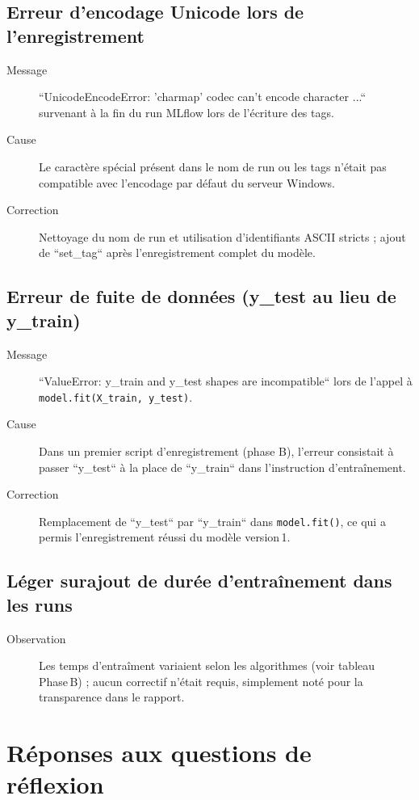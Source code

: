 \documentclass[12pt,a4paper]{report}
\begin{document}
\section{Erreur d'encodage Unicode lors de l'enregistrement}
\begin{description}
    \item[Message] ``UnicodeEncodeError: 'charmap' codec can't encode character ...`` survenant à la fin du run MLflow lors de l'écriture des tags.
    \item[Cause] Le caractère spécial présent dans le nom de run ou les tags n'était pas compatible avec l'encodage par défaut du serveur Windows.
    \item[Correction] Nettoyage du nom de run et utilisation d'identifiants ASCII stricts ; ajout de ``set\_tag`` après l'enregistrement complet du modèle.
\end{description}

\section{Erreur de fuite de données (y_test au lieu de y_train)}
\begin{description}
    \item[Message] ``ValueError: y_train and y_test shapes are incompatible`` lors de l'appel à \texttt{model.fit(X_train, y_test)}.
    \item[Cause] Dans un premier script d'enregistrement (phase B), l'erreur consistait à passer ``y_test`` à la place de ``y_train`` dans l'instruction d'entraînement.
    \item[Correction] Remplacement de ``y_test`` par ``y_train`` dans \texttt{model.fit()}, ce qui a permis l'enregistrement réussi du modèle version 1.
\end{description}

\section{Léger surajout de durée d'entraînement dans les runs}
\begin{description}
    \item[Observation] Les temps d'entraîment variaient selon les algorithmes (voir tableau Phase B) ; aucun correctif n'était requis, simplement noté pour la transparence dans le rapport.
\end{description}

\chapter*{Réponses aux questions de réflexion}
\end{document}
